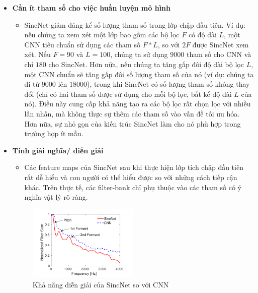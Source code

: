 \documentclass{article}
\begin{document}
\begin{itemize}
\begin{itemize}
		\end{itemize}
		\item \textbf{Cần ít tham số cho việc huấn luyện mô hình}
		\begin{itemize}
			\item SincNet giảm đáng kể số lượng tham số trong lớp chập đầu tiên. Ví dụ: nếu chúng ta xem xét một lớp bao gồm các bộ lọc $F$ có độ dài $L$, một CNN tiêu chuẩn sử dụng các tham số $F * L$, so với $2F$ được SincNet xem xét. Nếu $F = 90$ và $L = 100$, chúng ta sử dụng $9000$ tham số cho CNN và chỉ $180$ cho SincNet. Hơn nữa, nếu chúng ta tăng gấp đôi độ dài bộ lọc $L$, một CNN chuẩn sẽ tăng gấp đôi số lượng tham số của nó (ví dụ: chúng ta đi từ $9000$ lên $18000$), trong khi SincNet có số lượng tham số không thay đổi (chỉ có hai tham số được sử dụng cho mỗi bộ lọc, bất kể độ dài $L$ của nó). Điều này cung cấp khả năng tạo ra các bộ lọc rất chọn lọc với nhiều lần nhấn, mà không thực sự thêm các tham số vào vấn đề tối ưu hóa. Hơn nữa, sự nhỏ gọn của kiến trúc SincNet làm cho nó phù hợp trong trường hợp ít mẫu.
		\end{itemize}
		\item \textbf{Tính giải nghĩa/ diễn giải}
		\begin{itemize}
			\item Các feature maps của SincNet sau khi thực hiện lớp tích chập đầu tiên rất dễ hiểu và con người có thể hiểu được so với những cách tiếp cận khác. Trên thực tế, các filter-bank chỉ phụ thuộc vào các tham số có ý nghĩa vật lý rõ ràng.
		\end{itemize}
		\begin{figure}[H]
			\centering
			\includegraphics[width=0.5\textwidth]{images/interpretability.png}
			\caption{Khả năng diễn giải của SincNet so với CNN}
			\label{fig:writing-thesis}
		\end{figure}
		

\end{itemize}
\end{document}
